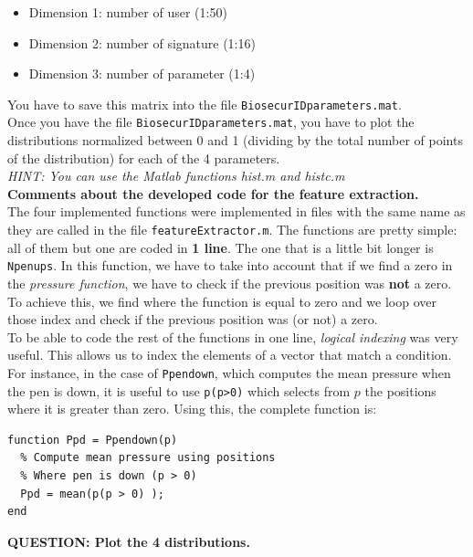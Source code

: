 \documentclass[a4paper]{article}
\def\inline{\lstinline[basicstyle=\ttfamily,keywordstyle={}]}
\begin{document}
{\begin{itemize}
\item	Dimension 1: number of user (1:50)
\item	Dimension 2: number of signature (1:16)
\item Dimension 3: number of parameter (1:4)
\end{itemize}

You have to save this matrix into the file \inline{BiosecurIDparameters.mat}.\\

Once you have the file \inline{BiosecurIDparameters.mat}, you have to plot the distributions normalized between 0 and 1 (dividing by the total number of points of the distribution) for each of the 4 parameters. \\
\emph{HINT: You can use the Matlab functions hist.m and histc.m}\\

\textbf{Comments about the developed code for the feature extraction.}\\

The four implemented functions were implemented in files with the same name as they are called in the file \inline{featureExtractor.m}. The functions are pretty simple: all of them but one are coded in \textbf{1 line}. The one that is a little bit longer is \inline{Npenups}. In this function, we have to take into account that if we find a zero in the \emph{pressure function}, we have to check if the previous position was \textbf{not} a zero. To achieve this, we find where the function is equal to zero and we loop over those index and check if the previous position was (or not) a zero.\\

To be able to code the rest of the functions in one line, \emph{logical indexing} was very useful. This allows us to index the elements of a vector that match a condition. For instance, in the case of \inline{Ppendown}, which computes the mean pressure when the pen is down, it is useful to use \inline{p(p>0)} which selects from \(p\) the positions where it is greater than zero. Using this, the complete function is:

\begin{verbatim}
function Ppd = Ppendown(p)
  % Compute mean pressure using positions 
  % Where pen is down (p > 0)
  Ppd = mean(p(p > 0) );
end
\end{verbatim}

\textbf{QUESTION:  Plot the 4 distributions.}\\

}
\end{document}
